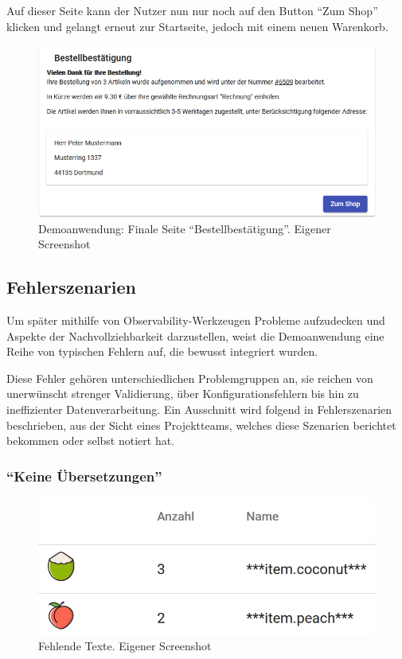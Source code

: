 Auf dieser Seite kann der Nutzer nun nur noch auf den Button \enquote{Zum Shop} klicken und gelangt erneut zur Startseite, jedoch mit einem neuen Warenkorb.

\begin{figure}[H]
	\centering
	\includegraphics[width=0.75\linewidth]{img/04_erstellung-poc/demoanwendung_vorstellung_06-bestellbestaetigung.png}
	\caption{Demoanwendung: Finale Seite \enquote{Bestellbestätigung}. Eigener Screenshot}
	\label{fig:demoanwendung_vorstellung_06-bestellbestaetigung}
\end{figure}

\subsection{Fehlerszenarien}
\label{subsec:fehlerszenarien}

Um später mithilfe von Observability-Werkzeugen Probleme aufzudecken und Aspekte der Nachvollziehbarkeit darzustellen, weist die Demoanwendung eine Reihe von typischen Fehlern auf, die bewusst integriert wurden.

Diese Fehler gehören unterschiedlichen Problemgruppen an, sie reichen von unerwünscht strenger Validierung, über Konfigurationsfehlern bis hin zu ineffizienter Datenverarbeitung. Ein Ausschnitt wird folgend in Fehlerszenarien beschrieben, aus der Sicht eines Projektteams, welches diese Szenarien berichtet bekommen oder selbst notiert hat.

\pagebreak

\subsubsection{\enquote{Keine Übersetzungen}}
\label{subsec:keine-uebersetzungen}

\begin{figure}
\centering
\vspace{-\baselineskip}
\includegraphics[width=\linewidth]{img/04_erstellung-poc/demoanwendung_fehlerszenario-uebersetzungen}
\caption{Fehlende Texte. Eigener Screenshot}
\label{fig:demoanwendung_fehlerszenario-uebersetzungen}
\end{figure}

